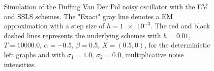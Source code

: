 \begin{figure}[htb]
{		\label{subfig:StoPhasePotraituffingVanDerPolSchenk}
	}
	\caption{
		Simulation of the Duffing Van Der Pol noisy oscillator 
		 with the EM and SSLS schemes.
		The "Exact" gray line denotes a EM approximation with a step size of $h=\num{1e-3}$. The red and 
		black dashed lines represents the underlying  schemes with
		$h = \num{0.01}$,
		$T = \num{10000.0}$,
		$\alpha = -\num{0.5}$,
		$\beta = \num{0.5}$,
		$X=(\num{0.5}, \num{0})$,
		for the deterministic left graphs and with 
		$\sigma_1 = 1.0$,
		$\sigma_2 = 0.0$,
		multiplicative noise intensities.
	}
	\label{fig:DuffingVanDerPolSDE}
\end{figure}